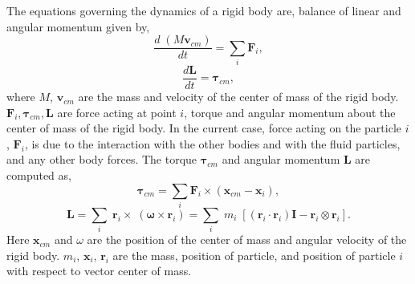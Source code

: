 \documentclass[preprint,12pt]{elsarticle}
\newcommand{\teng}[1]{\ensuremath{\boldsymbol{#1}}}
\newcommand{\ten}[1]{\ensuremath{\mathbf{#1}}}
\begin{document}
The equations governing the dynamics of a rigid body are, balance of linear and
angular momentum given by,
\begin{equation}
  \label{eq:rfc:balance_linear_mom}
  \frac{d \; (M \ten{v}_{cm})}{d t} = \sum_i \ten{F}_i,
\end{equation}
\begin{equation}
  \label{eq:rfc:balance_angular_mom}
  \frac{d \ten{L}}{d t} = \teng{\tau}_{cm},
\end{equation}
where $M$, $\ten{v}_{cm}$ are the mass and velocity of the center of mass of the rigid body.
$\ten{F}_i, \teng{\tau}_{cm}, \ten{L} $ are force acting at point $i$, torque and
angular momentum about the center of mass of the rigid body. In the current
case, force acting on the particle $i$, $\ten{F}_i$, is due to the interaction
with the other bodies and with the fluid particles, and any other body forces.
The torque $\teng{\tau}_{cm}$ and angular momentum $\ten{L}$ are computed as,
\begin{equation}
  \label{eq:rfc:torque}
 \teng{\tau}_{cm} = \sum_i \ten{F}_i \times (\ten{x}_{cm} - \ten{x}_{i}),
\end{equation}
\begin{equation}
  \label{eq:rfc:moi}
  \teng{L} =
  \sum_i \; \ten{r}_i \times \; (\teng{\omega} \times \ten{r}_i)
  = \sum_i \; m_i \; [(\ten{r}_i \cdot \ten{r}_i) \ten{I} - \ten{r}_i \otimes \ten{r}_i].
\end{equation}
Here $\ten{x}_{cm}$ and $\omega$ are the position of the center of mass and
angular velocity of the rigid body. $m_i$, $\ten{x}_{i}$, $\ten{r}_i$ are the
mass, position of particle, and position of particle $i$ with respect to vector
center of mass.
\end{document}
